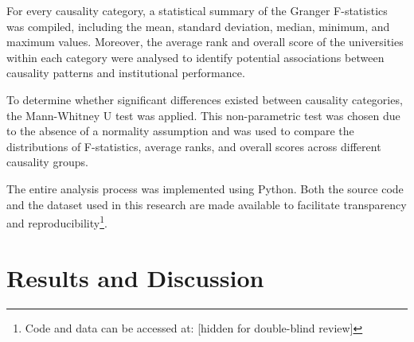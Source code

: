 \documentclass[a4paper, conference]{IEEEtran}
\begin{document}
For every causality category, a statistical summary of the Granger F-statistics was compiled, including the mean, standard deviation, median, minimum, and maximum values. Moreover, the average rank and overall score of the universities within each category were analysed to identify potential associations between causality patterns and institutional performance.

To determine whether significant differences existed between causality categories, the Mann-Whitney U test \cite{mann1947test} was applied. This non-parametric test was chosen due to the absence of a normality assumption and was used to compare the distributions of F-statistics, average ranks, and overall scores across different causality groups.

The entire analysis process was implemented using Python. Both the source code and the dataset used in this research are made available to facilitate transparency and reproducibility\footnote{Code and data can be accessed at:
	[hidden for double-blind review]
}.




\section{Results and Discussion}
\label{sec:results_and_discussion}
\end{document}
